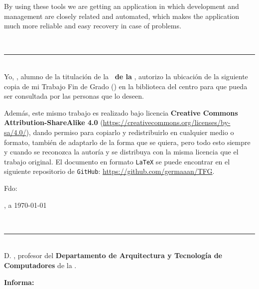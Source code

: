 {{\bigskip
By using these tools we are getting an application in which development and management are closely related and automated, which makes the application much more reliable and easy recovery in case of problems.

\newpage
\thispagestyle{empty}
\
\vspace{3cm}

\noindent\rule[-1ex]{\textwidth}{2pt}\\[4.5ex]

Yo, \textbf{\autor}, alumno de la titulación \textbf{\grado} de la \textbf{\escuela\ de la \universidad}, autorizo la ubicación de la siguiente copia de mi Trabajo Fin de Grado (\textit{\titulo}) en la biblioteca del centro para que pueda ser consultada por las personas que lo deseen.

\bigskip
Además, este mismo trabajo es realizado bajo licencia \textbf{Creative Commons Attribution-ShareAlike 4.0} (\url{https://creativecommons.org/licenses/by-sa/4.0/}), dando permiso para copiarlo y redistribuirlo en cualquier medio o formato, también de adaptarlo de la forma que se quiera, pero todo esto siempre y cuando se reconozca la autoría y se distribuya con la misma licencia que el trabajo original. El documento en formato {\tt LaTeX} se puede encontrar en el siguiente repositorio de {\tt GitHub}: \url{https://github.com/germaaan/TFG}.

\vspace{4cm}

\noindent Fdo: \autor

\vspace{2cm}

\begin{flushright}
\ciudad, a \today
\end{flushright}

\newpage
\thispagestyle{empty}
\
\vspace{3cm}

\noindent\rule[-1ex]{\textwidth}{2pt}\\[4.5ex]

D. \textbf{\tutor}, profesor del \textbf{Departamento de Arquitectura y Tecnología de Computadores} de la \textbf{\universidad}.

\vspace{0.5cm}

\vspace{0.5cm}

\textbf{Informa:}

\vspace{0.5cm}

}}
